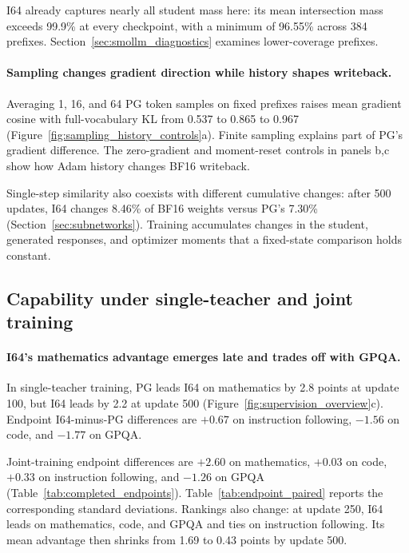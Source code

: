 

I64 already captures nearly all student mass here: its mean intersection mass exceeds 99.9\% at every checkpoint, with a minimum of 96.55\% across 384 prefixes. Section~\ref{sec:smollm_diagnostics} examines lower-coverage prefixes.

\paragraph{Sampling changes gradient direction while history shapes writeback.}
Averaging 1, 16, and 64 PG token samples on fixed prefixes raises mean gradient cosine with full-vocabulary KL from 0.537 to 0.865 to 0.967 (Figure~\ref{fig:sampling_history_controls}a). Finite sampling explains part of PG's gradient difference. The zero-gradient and moment-reset controls in panels b,c show how Adam history changes BF16 writeback.



Single-step similarity also coexists with different cumulative changes: after 500 updates, I64 changes 8.46\% of BF16 weights versus PG's 7.30\% (Section~\ref{sec:subnetworks}). Training accumulates changes in the student, generated responses, and optimizer moments that a fixed-state comparison holds constant.

\subsection{Capability under single-teacher and joint training}

\paragraph{I64's mathematics advantage emerges late and trades off with GPQA.}
In single-teacher training, PG leads I64 on mathematics by 2.8 points at update 100, but I64 leads by 2.2 at update 500 (Figure~\ref{fig:supervision_overview}c). Endpoint I64-minus-PG differences are $+0.67$ on instruction following, $-1.56$ on code, and $-1.77$ on GPQA.

Joint-training endpoint differences are $+2.60$ on mathematics, $+0.03$ on code, $+0.33$ on instruction following, and $-1.26$ on GPQA (Table~\ref{tab:completed_endpoints}). Table~\ref{tab:endpoint_paired} reports the corresponding standard deviations. Rankings also change: at update 250, I64 leads on mathematics, code, and GPQA and ties on instruction following. Its mean advantage then shrinks from 1.69 to 0.43 points by update 500.


